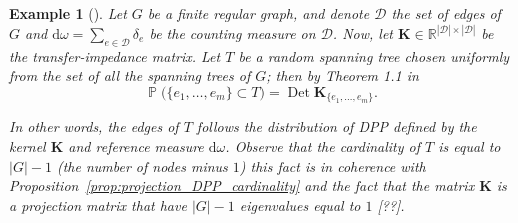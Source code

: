 \documentclass[twoside,11pt]{book}
\newtheorem{example}{Example}
\numberwithin{theorem}{chapter}
\numberwithin{definition}{chapter}
\numberwithin{proposition}{chapter}
\numberwithin{corollary}{chapter}
\numberwithin{example}{chapter}
\numberwithin{lemma}{chapter}
\numberwithin{assumption}{chapter}
\DeclareMathOperator{\Det}{Det}
\DeclareMathOperator{\Prb}{\mathbb{P}}
\begin{document}
\begin{example}[\cite{BuPe93}]
Let $G$ be a finite regular graph, and denote $\mathcal{D}$ the set of edges of $G$ and $\mathrm{d}\omega = \sum_{e \in \mathcal{D}} \delta_{e}$ be the counting measure on $\mathcal{D}$. Now, let $\bm{K} \in \mathbb{R}^{|\mathcal{D}| \times |\mathcal{D}|}$ be the transfer-impedance matrix. Let $T$ be a random spanning tree chosen uniformly from the
set of all the spanning trees of $G$; then by Theorem 1.1 in \cite{BuPe93}
\begin{equation}
\Prb \Big( \{e_{1}, \dots , e_{m} \} \subset T \Big) = \Det \bm{K}_{\{e_{1}, \dots , e_{m}\}}.
\end{equation}

In other words, the edges of $T$ follows the distribution of DPP defined by the kernel $\bm{K}$ and reference measure $\mathrm{d}\omega$. Observe that the cardinality of $T$ is equal to $|G|-1$ (the number of nodes minus $1$) this fact is in coherence with Proposition~\ref{prop:projection_DPP_cardinality} and the fact that the matrix $\bm{K}$ is a projection matrix that have $|G|-1$ eigenvalues equal to $1$ [??]. 





\end{example}



\end{document}
